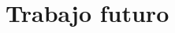 \begin{comment}



El problema que se estableció en este trabajo fue el de estudiar las operaciones PCE en sistemas de qubits que cumplen con las condiciones para ser canales cuánticos. Específicamente, se estudió el caso de 1 qubit. Una operación PCE (Pauli component erasing) es una operación lineal que borra las
componentes del vector de Bloch (generalizado, en el caso de n qubits). El problema en el contexto de los sistemas cerrados es trivial, todas las operaciones PCE representan dinámicas físicas que podrían atravesar los estados cuánticos. Sin embargo, para el caso de los sistemas abiertos la condición de
completa positividad debe ser cumplida por una operación PCE para que describa una evolución física. Se diseñó un método numérico para evaluar la condición de CP de las operaciones PCE y se encontró que 5 de las 8 operaciones PCE de 1 qubit son operaciones cuánticas: la identidad, el  canal totalmente despolarizante y tres canales que mapean la esfera de Bloch a una línea sobre cada uno de los ejes. El estudio de las operaciones PCE de 1 qubit sentaron las bases para el estudio  de una caracterización general de las operaciones PCE que se pretende continuar en el trabajo de graduación de licenciatura.
\end{comment}

\section{Trabajo futuro}